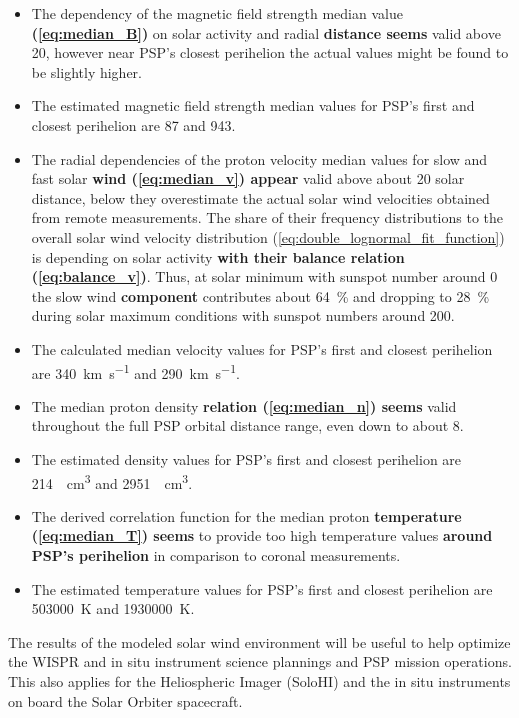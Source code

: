 \begin{itemize}
	\item The dependency of the magnetic field strength median value \textbf{(\ref{eq:median_B})} on solar activity and radial \textbf{distance seems} valid above \SI{20}{\Rs}, however near PSP's closest perihelion the actual values might be found to be slightly higher.
	\item The estimated magnetic field strength median values for PSP's first and closest perihelion are \SI{87}{\nT} and \SI{943}{\nT}.
	\item The radial dependencies of the proton velocity median values for slow and fast solar \textbf{wind (\ref{eq:median_v}) appear} valid above about \SI{20}{\Rs} solar distance, below they overestimate the actual solar wind velocities obtained from remote measurements. The share of their frequency distributions to the overall solar wind velocity distribution (\ref{eq:double_lognormal_fit_function}) is depending on solar activity \textbf{with their balance relation (\ref{eq:balance_v})}. Thus, at solar minimum with sunspot number around 0 the slow wind \textbf{component} contributes about \SI{64}{\%} and dropping to \SI{28}{\%} during solar maximum conditions with sunspot numbers around 200.
	\item The calculated median velocity values for PSP's first and closest perihelion are \SI{340}{\km\per\s} and \SI{290}{\km\per\s}.
	\item The median proton density \textbf{relation (\ref{eq:median_n}) seems} valid throughout the full PSP orbital distance range, even down to about \SI{8}{\Rs}.
	\item The estimated density values for PSP's first and closest perihelion are \SI{214}{\per\cm\cubed} and \SI{2951}{\per\cm\cubed}.
	\item The derived correlation function for the median proton \textbf{temperature (\ref{eq:median_T}) seems} to provide too high temperature values \textbf{around PSP’s perihelion} in comparison to coronal measurements.
	\item The estimated temperature values for PSP's first and closest perihelion are \SI{503000}{\K} and \SI{1930000}{\K}.
\end{itemize}

The results of the modeled solar wind environment will be useful to help optimize the WISPR and in situ instrument science plannings and PSP mission operations. This also applies for the Heliospheric Imager (SoloHI) \citep{Howard2013} and the in situ instruments on board the Solar Orbiter spacecraft.

